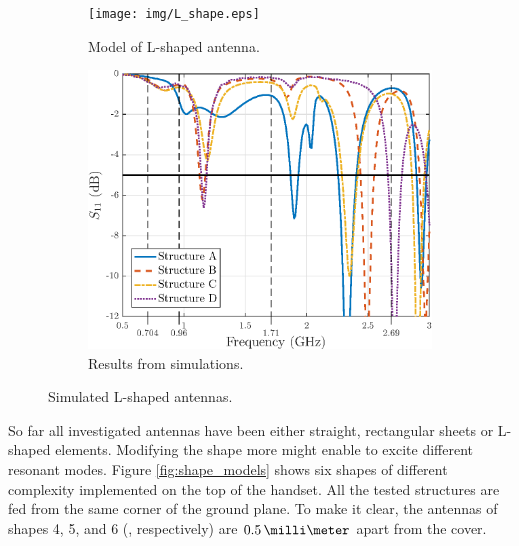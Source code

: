 \begin{figure}[H]
    \centering
    \begin{subfigure}[b]{0.49\textwidth}
        \texttt{[image: img/L\_shape.eps]}
        \caption{Model of L-shaped antenna.}
        \label{fig:l_shape_model}
    \end{subfigure}
    \begin{subfigure}[b]{0.49\textwidth}
        \includegraphics[width=\textwidth]{img/L_shape_res.eps}
        \caption{Results from simulations.}
        \label{fig:l_shape_res}
    \end{subfigure}
    \caption{Simulated L-shaped antennas.}
    \label{fig:l_shape}
\end{figure}

So far all investigated antennas have been either straight, rectangular sheets or L-shaped elements. Modifying the shape more might enable to excite different resonant modes. Figure \ref{fig:shape_models} shows six shapes of different complexity implemented on the top of the handset. All the tested structures are fed from the same corner of the ground plane. To make it clear, the antennas of shapes 4, 5, and 6 (, respectively) are $0.5\,\milli\meter$ apart from the cover.

